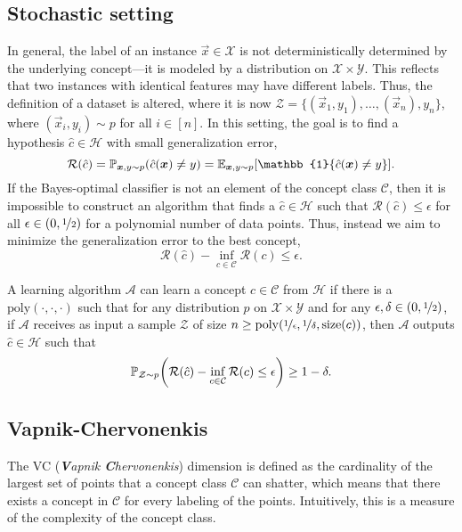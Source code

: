 \subsection{Stochastic setting}

In general, the label of an instance $\vec{x} \in \mathcal{X}$ is not deterministically determined
by the underlying concept---it is modeled by a distribution on $\mathcal{X} \times \mathcal{Y}$.
This reflects that two instances with identical features may have different labels. Thus, the
definition of a dataset is altered, where it is now $\mathcal{Z} = \{ (\vec{x}_1, y_1), \ldots,
    (\vec{x}_n), y_n \}$, where $(\vec{x}_i, y_i) \sim p$ for all $i \in [n]$. In this setting, the
goal is to find a hypothesis $\hat{c} \in \mathcal{H}$ with small generalization error, \[
    \mathcal{R}(\hat{c}) = \mathbb{P}_{\vec{x},y \sim p} (\hat{c}(\vec{x}) \neq y) = \E_{\vec{x},y\sim p} \lft[ \mathbb{1}\{ \hat{c}(\vec{x}) \neq y \} \rgt].
\]
If the Bayes-optimal classifier is not an element of the concept class $\mathcal{C}$, then it is
impossible to construct an algorithm that finds a $\hat{c} \in \mathcal{H}$ such that
$\mathcal{R}(\hat{c}) \leq \epsilon$ for all $\epsilon \in (0,\nicefrac{1}{2})$ for a polynomial
number of data points. Thus, instead we aim to minimize the generalization error to the best
concept, \[
    \mathcal{R}(\hat{c}) - \inf_{c \in \mathcal{C}} \mathcal{R}(c) \leq \epsilon.
\]

\begin{definition}
    A learning algorithm $\mathcal{A}$ can learn a concept $c \in \mathcal{C}$ from $\mathcal{H}$ if
    there is a $\mathrm{poly}(\cdot, \cdot, \cdot)$ such that for any distribution $p$ on
    $\mathcal{X} \times \mathcal{Y}$ and for any $\epsilon,\delta\in (0,\nicefrac{1}{2})$, if
    $\mathcal{A}$ receives as input a sample $\mathcal{Z}$ of size $n \geq
        \mathrm{poly}(\nicefrac{1}{\epsilon},\nicefrac{1}{\delta},\mathrm{size}(c))$, then $\mathcal{A}$ outputs $\hat{c} \in \mathcal{H}$ such that \[
        \mathbb{P}_{\mathcal{Z} \sim p} \lft( \mathcal{R}(\hat{c}) - \inf_{c \in \mathcal{C}} \mathcal{R}(c) \leq \epsilon \rgt) \geq 1-\delta.
    \]
\end{definition}

\subsection{Vapnik-Chervonenkis}

The VC (\textit{\textbf{V}apnik \textbf{C}hervonenkis}) dimension is defined as the cardinality of
the largest set of points that a concept class $\mathcal{C}$ can shatter, which means that there
exists a concept in $\mathcal{C}$ for every labeling of the points. Intuitively, this is a measure
of the complexity of the concept class.

